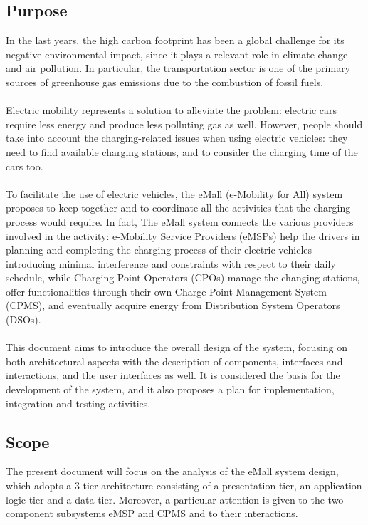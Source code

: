 \documentclass[../main.tex]{subfiles}
\begin{document}
\subsection{Purpose}
In the last years, the high carbon footprint has been a global challenge for its negative environmental impact, since it plays a relevant role in climate change and air pollution. In particular, the transportation sector is one of the primary sources of greenhouse gas emissions due to the combustion of fossil fuels.
\\
\\
Electric mobility represents a solution to alleviate the problem: electric cars require less energy and produce less polluting gas as well. However, people should take into account the charging-related issues when using electric vehicles: they need to find available charging stations, and to consider the charging time of the cars too.
\\
\\
To facilitate the use of electric vehicles, the eMall (e-Mobility for All) system proposes to keep together and to coordinate all the activities that the charging process would require. In fact, The eMall system connects the various providers involved in the activity: e-Mobility Service Providers (eMSPs) help the drivers in planning and completing the charging process of their electric vehicles introducing minimal interference and constraints with respect to their daily schedule, while Charging Point Operators (CPOs) manage the changing stations, offer functionalities through their own Charge Point Management System (CPMS), and eventually acquire energy from Distribution System Operators (DSOs).
\\
\\
This document aims to introduce the overall design of the system, focusing on both architectural aspects with the description of components, interfaces and interactions, and the user interfaces as well. It is considered the basis for the development of the system, and it also proposes a plan for implementation, integration and testing activities. 


\subsection{Scope}
The present document will focus on the analysis of the eMall system design, which adopts a 3-tier architecture consisting of a presentation tier, an application logic tier and a data tier. Moreover, a particular attention is given to the two component subsystems eMSP and CPMS and to their interactions. 
\end{document}
